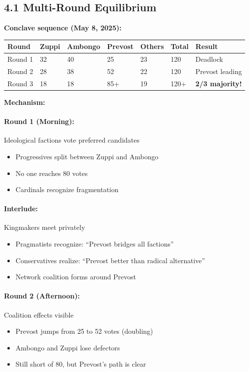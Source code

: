 \subsection{4.1 Multi-Round Equilibrium}

\textbf{Conclave sequence (May 8, 2025):}

\begin{table}[h]
\centering
\begin{tabular}{|l|l|l|l|l|l|l|}
\hline
\textbf{Round} & \textbf{Zuppi} & \textbf{Ambongo} & \textbf{Prevost} & \textbf{Others} & \textbf{Total} & \textbf{Result} \\
\hline
Round 1 & 32 & 40 & 25 & 23 & 120 & Deadlock \\
Round 2 & 28 & 38 & 52 & 22 & 120 & Prevost leading \\
Round 3 & 18 & 18 & 85+ & 19 & 120+ & \textbf{2/3 majority!} \\
\hline
\end{tabular}
\end{table}

\textbf{Mechanism:}

\paragraph{Round 1 (Morning):} Ideological factions vote preferred candidates
\begin{itemize}
\item Progressives split between Zuppi and Ambongo
\item No one reaches 80 votes
\item Cardinals recognize fragmentation
\end{itemize}

\paragraph{Interlude:} Kingmakers meet privately
\begin{itemize}
\item Pragmatists recognize: ``Prevost bridges all factions''
\item Conservatives realize: ``Prevost better than radical alternative''
\item Network coalition forms around Prevost
\end{itemize}

\paragraph{Round 2 (Afternoon):} Coalition effects visible
\begin{itemize}
\item Prevost jumps from 25 to 52 votes (doubling)
\item Ambongo and Zuppi lose defectors
\item Still short of 80, but Prevost's path is clear
\end{itemize}

